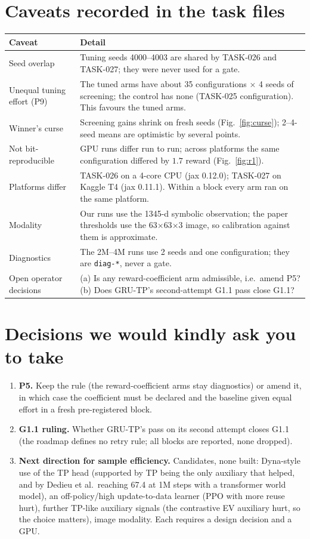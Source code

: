 \documentclass[10pt,a4paper]{article}
\newcommand{\p}[1]{\texttt{\small #1}}
\begin{document}
\section{Caveats recorded in the task files}
\small
\begin{center}\begin{tabular}{@{}p{4.3cm}p{11.5cm}@{}}\toprule
\textbf{Caveat} & \textbf{Detail}\\\midrule
Seed overlap & Tuning seeds 4000--4003 are shared by TASK-026 and TASK-027; they were never used for a gate.\\
Unequal tuning effort (P9) & The tuned arms have about 35 configurations $\times$ 4 seeds of screening; the control has none (TASK-025 configuration). This favours the tuned arms.\\
Winner's curse & Screening gains shrink on fresh seeds (Fig.~\ref{fig:curse}); 2--4-seed means are optimistic by several points.\\
Not bit-reproducible & GPU runs differ run to run; across platforms the same configuration differed by $1.7$ reward (Fig.~\ref{fig:r1}).\\
Platforms differ & TASK-026 on a 4-core CPU (jax 0.12.0); TASK-027 on Kaggle T4 (jax 0.11.1). Within a block every arm ran on the same platform.\\
Modality & Our runs use the 1345-d symbolic observation; the paper thresholds use the 63$\times$63$\times$3 image, so calibration against them is approximate.\\
Diagnostics & The 2M--4M runs use 2 seeds and one configuration; they are \p{diag-*}, never a gate.\\
Open operator decisions & (a) Is any reward-coefficient arm admissible, i.e.\ amend P5? (b) Does GRU-TP's second-attempt G1.1 pass close G1.1?\\\bottomrule
\end{tabular}\end{center}
\normalsize

\section{Decisions we would kindly ask you to take}
\begin{enumerate}\itemsep2pt
\item \textbf{P5.} Keep the rule (the reward-coefficient arms stay diagnostics) or amend it, in which case the coefficient must be declared and the baseline given equal effort in a fresh pre-registered block.
\item \textbf{G1.1 ruling.} Whether GRU-TP's pass on its second attempt closes G1.1 (the roadmap defines no retry rule; all blocks are reported, none dropped).
\item \textbf{Next direction for sample efficiency.} Candidates, none built: Dyna-style use of the TP head (supported by TP being the only auxiliary that helped, and by Dedieu et al.\ reaching 67.4 at 1M steps with a transformer world model), an off-policy/high update-to-data learner (PPO with more reuse hurt), further TP-like auxiliary signals (the contrastive EV auxiliary hurt, so the choice matters), image modality. Each requires a design decision and a GPU.
\end{enumerate}
\end{document}
